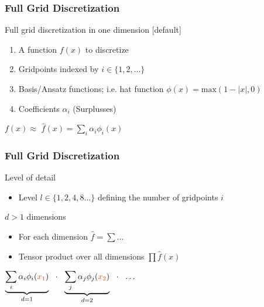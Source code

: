 \begin{frame}
  \frametitle{Full Grid Discretization}
  \topline
  \vspace{-10px}
  \begin{block}{Full grid discretization in one dimension}
    [default]
    \begin{enumerate}
    \item A function $f(x)$ to discretize
    \item Gridpoints indexed by $i \in \{1,2,\dots\}$
    \item Basis/Ansatz functions; i.e. hat function $\phi(x)=\text{max}(1 - |x|, 0)$
    \item Coefficients $\alpha_i$ (Surplusses)
    \end{enumerate}
    \vspace{10px}
    \begin{center}
      $f(x) \approx$ $\hat{f}(x) = \sum_{i}^{}{\alpha_i \phi_i(x)}$
    \end{center}
  \end{block}
\end{frame}

\begin{frame}
  \frametitle{Full Grid Discretization}
  \topline
  \vspace{-10px}
  \begin{block}{Level of detail}
    \begin{itemize}
    \item Level $l \in \{1,2,4,8\dots\}$ defining the number of gridpoints $i$
    \end{itemize}
  \end{block}
  \begin{block}{$d > 1$ dimensions}
    \begin{itemize}
    \item For each dimension $\hat{f} = \sum{\dots}$
    \item Tensor product over all dimensions $\prod{ \hat{f}(x) }$
    \end{itemize}
    \vspace{7px}
    \begin{center}
      $\underbrace{
        \sum_i{\alpha_i \phi_i(\color{uipoppy}{x_1}\color{black}{)}}
      }_{d = 1}
      \ \
      \cdot
      \ \
      \underbrace{
        \sum_j{\alpha_j \phi_j(\color{uipoppy}{x_2}\color{black}{)}}
      }_{d = 2}
      \ \
      \cdot
      \ \
      \dots$
    \end{center}
  \end{block}
\end{frame}

